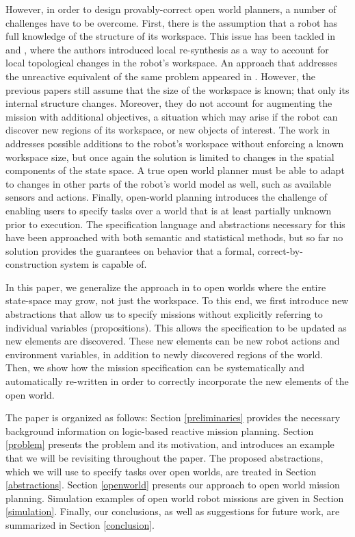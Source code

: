 However, in order to design provably-correct open world planners, a number of challenges have to be overcome. 
First, there is the assumption that a robot has full knowledge of the structure of its workspace. This issue has been tackled in \cite{MurrayICRA2012} and \cite{MurrayICRA2013a}, where the authors introduced local re-synthesis as a way to account for local topological changes in the robot's workspace. 
An approach that addresses the unreactive equivalent of the same problem appeared in \cite{Dimos2013ICRA}. 
However, the previous papers still assume that the size of the workspace is known; that only its internal structure changes. Moreover, they do not account for augmenting the mission with additional objectives, a situation which may arise if the robot can discover new regions of its workspace, or new objects of interest. 
The work in \cite{BingxinRSS2012} addresses possible additions to the robot's workspace without enforcing a known workspace size, but once again the solution is limited to changes in the spatial components of the state space. 
A true open world planner must be able to adapt to changes in other parts of the robot's world model as well, such as available sensors and actions. 
Finally, open-world planning introduces the challenge of enabling users to specify tasks over a world that is at least partially unknown prior to execution. The specification language and abstractions necessary for this have been approached with both semantic \cite{Joshi2012} \cite{Talamadupula2010} and statistical \cite{Tellex2011} methods, but so far no solution provides the guarantees on behavior that a formal, correct-by-construction system is capable of. 

In this paper, we generalize the approach in \cite{BingxinRSS2012} to open worlds where the entire state-space may grow, not just the workspace. 
To this end, we first introduce new abstractions that allow us to specify missions without explicitly referring to individual variables (propositions). This allows the specification to be updated as new elements are discovered. These new elements can be new robot actions and environment variables, in addition to newly discovered regions of the world. 
Then, we show how the mission specification can be systematically and automatically re-written in order to correctly incorporate the new elements of the open world.

The paper is organized as follows: Section \ref{preliminaries} provides the necessary background information on logic-based reactive mission planning. Section \ref{problem} presents the problem and its motivation, and introduces an example that we will be revisiting throughout the paper. The proposed abstractions, which we will use to specify tasks over open worlds, are treated in Section \ref{abstractions}. Section \ref{openworld} presents our approach to open world mission planning. Simulation examples of open world robot missions are given in Section \ref{simulation}. Finally, our conclusions, as well as suggestions for future work, are summarized in Section \ref{conclusion}.


